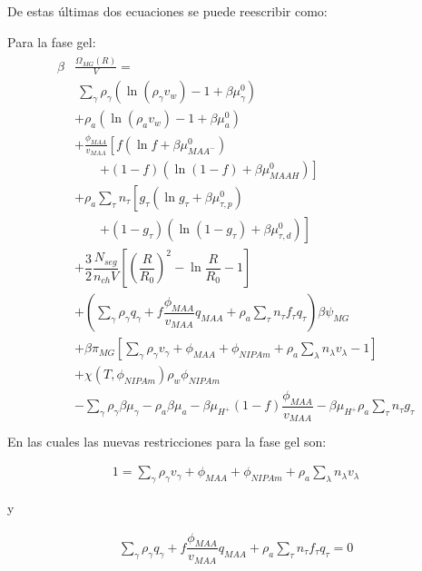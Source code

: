De estas \'ultimas dos ecuaciones se puede reescribir como:

Para la fase gel:
\begin{align}
	\begin{aligned}
		\beta&\frac{\Omega_{MG}(R)}{V}=\\
		& ~ \sum_{\gamma} \rho_\gamma\left(\ln\left(\rho_\gamma v_w\right) -1 + \beta\mu^0_\gamma\right) \\
		&+ \rho_a\left(\ln\left(\rho_a v_w\right) -1 + \beta\mu^0_a\right) \\
		& + \frac{\phi_{MAA}}{v_{MAA}} \left[f(\ln f+ \beta\mu^0_{MAA^-})\right.\\
		&\qquad\left.+(1-f)(\ln (1-f)+\beta\mu^0_{MAAH})\right] \\
		& + \rho_a \sum_\tau n_\tau  \left[g_\tau(\ln g_\tau+ \beta\mu^0_{\tau,p})\right.\\
		&\qquad\left.+(1-g_\tau)(\ln (1-g_\tau)+\beta\mu^0_{\tau,d})\right] \\
		& + \dfrac{3}{2}\dfrac{N_{seg}}{n_{ch} V}\left[\left(\dfrac{R}{R_0}\right)^2 - \ln\dfrac{R}{R_0} -1\right] \\
		& +  \left(\sum_{\gamma } {\rho_\gamma q_\gamma + f\dfrac{\phi_{MAA}}{v_{MAA}}q_{MAA}} + \rho_a \sum_\tau n_\tau f_\tau q_\tau \right)\beta\psi_{MG}\\
		& +\beta\pi_{MG} \left[ \sum_{\gamma } \rho_\gamma v_\gamma  + \phi_{MAA} + \phi_{NIPAm} + \rho_a \sum_\lambda n_\lambda v_\lambda -1 \right] \\
		& + \chi (T, \phi_{NIPAm})\rho_w \phi_{NIPAm} \\
		& -\sum_{\gamma }{\rho_\gamma\beta\mu_\gamma} -\rho_a\beta\mu_a
		-\beta\mu_{H^+}(1-f)\dfrac{\phi_{MAA}}{v_{MAA}} 
		-\beta\mu_{H^+} \rho_a \sum_\tau n_\tau g_\tau\\
	\end{aligned}
	\label{eq:gel:total}
\end{align}
En las cuales las nuevas restricciones para la fase gel son:

\begin{align}
	1 = \sum_{\gamma } \rho_\gamma v_\gamma  + \phi_{MAA} + \phi_{NIPAm} + \rho_a \sum_\lambda n_\lambda v_\lambda
	\label{eq:gel:packing-g-total}
\end{align}

y 

\begin{align}
	\sum_{\gamma } {\rho_\gamma q_\gamma + f\dfrac{\phi_{MAA}}{v_{MAA}}q_{MAA}} + \rho_a \sum_\tau n_\tau f_\tau q_\tau = 0
\end{align}

